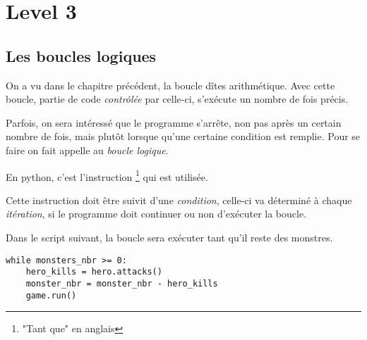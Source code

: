 





\chapter{Level 3}

\section{Les boucles logiques}

On a vu dans le chapitre précédent, la boucle dîtes arithmétique. Avec cette boucle, partie de code \emph{contrôlée} par celle-ci, s'exécute un nombre de fois précis.

Parfois, on sera intéressé que le programme s'arrête, non pas après un certain nombre de fois, mais plutôt lorsque qu'une certaine condition est remplie. Pour se faire on fait appelle au \emph{boucle logique}.

En python, c'est l'instruction \footnote{"Tant que" en anglais} qui est utilisée.

Cette instruction doit être suivit d'une \emph{condition}, celle-ci va déterminé à chaque \emph{itération}, si le programme doit continuer ou non d'exécuter la boucle.

Dans le script suivant, la boucle sera exécuter tant qu'il reste des monstres.

\begin{lstlisting}
while monsters_nbr >= 0:
	hero_kills = hero.attacks()
	monster_nbr = monster_nbr - hero_kills
	game.run()
\end{lstlisting}

